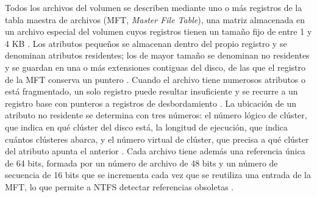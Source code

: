 \documentclass[12pt]{article}
\begin{document}
Todos los archivos del volumen se describen mediante uno o más registros de la tabla maestra de archivos (MFT, \textit{Master File Table}), una matriz almacenada en un archivo especial del volumen cuyos registros tienen un tamaño fijo de entre 1 y 4 KB \parencite[\S 22.5.1, p.\ 744]{silberschatz2006fundamentos}. Los atributos pequeños se almacenan dentro del propio registro y se denominan atributos residentes; los de mayor tamaño se denominan no residentes y se guardan en una o más extensiones contiguas del disco, de las que el registro de la MFT conserva un puntero \parencite[\S 22.5.1, p.\ 744]{silberschatz2006fundamentos}. Cuando el archivo tiene numerosos atributos o está fragmentado, un solo registro puede resultar insuficiente y se recurre a un registro base con punteros a registros de desbordamiento \parencite[\S 22.5.1, p.\ 744]{silberschatz2006fundamentos}. La ubicación de un atributo no residente se determina con tres números: el número lógico de clúster, que indica en qué clúster del disco está, la longitud de ejecución, que indica cuántos clústeres abarca, y el número virtual de clúster, que precisa a qué clúster del atributo apunta el anterior \parencite[\S 21.8.2, p.\ 1075]{deitel2004operating}. Cada archivo tiene además una referencia única de 64 bits, formada por un número de archivo de 48 bits y un número de secuencia de 16 bits que se incrementa cada vez que se reutiliza una entrada de la MFT, lo que permite a NTFS detectar referencias obsoletas \parencite[\S 22.5.1, p.\ 744]{silberschatz2006fundamentos}.
\end{document}

